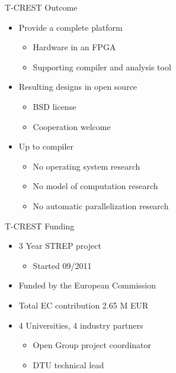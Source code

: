 \documentclass[17pt]{beamer}
\begin{document}
\begin{frame}{T-CREST Outcome}
  \begin{itemize}
  \item Provide a complete platform
    \begin{itemize}
    \item Hardware in an FPGA
    \item Supporting compiler and analysis tool
    \end{itemize}
  \item Resulting designs in open source
    \begin{itemize}
    \item BSD license
    \item Cooperation welcome
    \end{itemize}
  \item Up to compiler
    \begin{itemize}
    \item No operating system research
    \item No model of computation research
    \item No automatic parallelization research
    \end{itemize}
  \end{itemize}  
\end{frame}

\begin{frame}{T-CREST Funding}
  \begin{itemize}
  \item 3 Year STREP project
    \begin{itemize}
    \item Started 09/2011
    \end{itemize}
  \item Funded by the European Commission
  \item Total EC contribution 2.65 M EUR
  \item 4 Universities, 4 industry partners
    \begin{itemize}
    \item Open Group project coordinator
    \item DTU technical lead      
    \end{itemize}
  \end{itemize}  
\end{frame}
\end{document}
